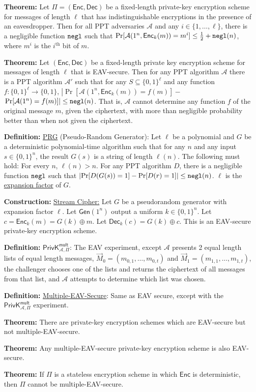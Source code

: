 \documentclass[12pt]{article}
\newcommand{\AAA}{\mathcal{A}}
\newcommand{\defn}[1]{{\bf Definition:} \underline{#1}}
\newcommand{\thm}[1]{{\bf Theorem:} \underline{#1}}
\newcommand{\con}[1]{{\bf Construction:} \underline{#1}}
\newcommand{\Enc}{\mathsf{Enc}}
\newcommand{\Dec}{\mathsf{Dec}}
\newcommand{\Gen}{\mathsf{Gen}}
\newcommand{\ExptMultArgs}[2]{\mathsf{PrivK}^{\mathsf{mult}}_{#1,#2}}
\newcommand{\ExptMult}{\ExptMultArgs{\AAA}{\Pi}}
\newcommand{\xor}{\oplus}
\newcommand{\negl}{{\tt negl}}
\begin{document}
\begin{multicols}{3}
\thm{}Let $\Pi=(\Enc,\Dec)$ be a fixed-length private-key encryption scheme for messages of length $\ell$ that has indistinguishable encryptions in the presence of an eavesdropper. Then for all PPT adversaries $\AAA$ and any $i\in\{1,\dots,\ell\}$, there is a negligible function $\negl$ such that $\Pr[\AAA(1^n,\Enc_k(m))=m^i]\leq\frac{1}{2}+\negl(n)$, where $m^i$ is the $i^{\text{th}}$ bit of $m$.

\thm{}Let $(\Enc,\Dec)$ be a fixed-length private key encryption scheme for messages of length $\ell$ that is EAV-secure. Then for any PPT algorithm $\AAA$ there is a PPT algorithm $\AAA'$ such that for any $S\subseteq\{0,1\}^\ell$ and any function $f:\{0,1\}^\ell\to\{0,1\}$, $\left|\Pr[\AAA(1^n,\Enc_k(m))=f(m)]-\right.$ $\left.\Pr[\AAA(1^n)=f(m)]\right|\leq\negl(n)$. That is, $\AAA$ cannot determine any function $f$ of the original message $m$, given the ciphertext, with more than negligible probability better than when not given the ciphertext.

\defn{PRG} (Pseudo-Random Generator): Let $\ell$ be a polynomial and $G$ be a deterministic polynomial-time algorithm such that for any $n$ and any input $s\in\{0,1\}^n$, the result $G(s)$ is a string of length $\ell(n)$. The following must hold: For every $n$, $\ell(n)>n$. For any PPT algorithm $D$, there is a negligible function $\negl$ such that $\left|\Pr[D(G(s))=1]-\Pr[D(r)=1]\right|\leq\negl(n)$. $\ell$ is the \underline{expansion factor} of $G$.

\con{Stream Cipher:} Let $G$ be a pseudorandom generator with expansion factor $\ell$. Let $\Gen(1^n)$ output a uniform $k\in\{0,1\}^n$. Let $c=\Enc_k(m)=G(k)\xor m$. Let $\Dec_k(c)=G(k)\xor c$. This is an EAV-secure private-key encryption scheme.

\defn{$\ExptMult$}: The EAV experiment, except $\AAA$ presents 2 equal length lists of equal length messages, $\vec{M}_0=(m_{0,1},\dots,m_{0,t})$ and $\vec{M}_1=(m_{1,1},\dots,m_{1,t})$, the challenger chooses one of the lists and returns the ciphertext of all messages from that list, and $\AAA$ attempts to determine which list was chosen.

\defn{Multiple-EAV-Secure}: Same as EAV secure, except with the $\ExptMult$ experiment.

\thm{}There are private-key encryption schemes which are EAV-secure but not multiple-EAV-secure.

\thm{}Any multiple-EAV-secure private-key encryption scheme is also EAV-secure.

\thm{}If $\Pi$ is a stateless encryption scheme in which $\Enc$ is deterministic, then $\Pi$ cannot be multiple-EAV-secure.


\end{multicols}
\end{document}
